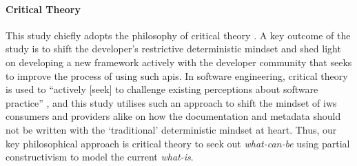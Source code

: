 \paragraph{Critical Theory}
This study chiefly adopts the philosophy of critical theory \citep{Calhoun:1995ww}. A key outcome of the study is to shift the developer's restrictive deterministic mindset and shed light on developing a new framework actively with the developer community that seeks to improve the process of using such \glspl{api}. In software engineering, critical theory is used to ``actively [seek] to challenge existing perceptions about software practice'' \citep{Easterbrook:2007ws}, and this study utilises such an approach to shift the mindset of \gls{iws} consumers and providers alike on how the documentation and metadata should not be written with the `traditional' deterministic mindset at heart. Thus, our key philosophical approach is critical theory to seek out \textit{what-can-be} using  partial constructivism to model the current \textit{what-is}.
